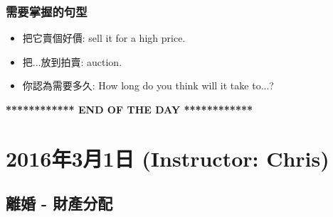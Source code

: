 \subsubsection*{需要掌握的句型}
\begin{multicols}{2}
\begin{itemize}
  \itemsep0em
  \item 把它賣個好價: sell it for a high price.
  \item 把...放到拍賣:  auction.
  \item 你認為需要多久: How long do you think will it take to...?
\end{itemize}
\end{multicols}

\vspace{15mm}

\begin{center}
  \textbf{************ END OF THE DAY ************}
\end{center}
\newpage

\section{2016年3月1日 (Instructor: Chris)}
\subsection{離婚 - 財產分配}
